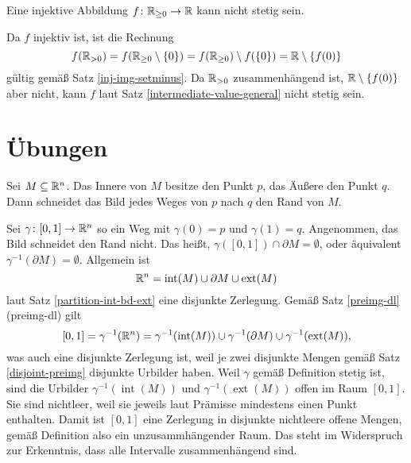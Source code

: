 \begin{Satz}
Eine injektive Abbildung $f\colon\mathbb R_{\ge 0}\to\mathbb R$ kann nicht stetig sein.
\end{Satz}
\begin{Beweis}
Da $f$ injektiv ist, ist die Rechnung
\[f(\mathbb R_{>0}) = f(\mathbb R_{\ge 0}\setminus\{0\})
= f(\mathbb R_{\ge 0})\setminus f(\{0\}) = \mathbb R\setminus\{f(0)\}\]
gültig gemäß Satz \ref{inj-img-setminus}. Da $\mathbb R_{>0}$ zusammenhängend
ist, $\mathbb R\setminus\{f(0)\}$ aber nicht, kann $f$ laut Satz
\ref{intermediate-value-general} nicht stetig sein.\,\qedsymbol
\end{Beweis}

\newpage
\section{Übungen}

\begin{Satz}
Sei $M\subseteq\mathbb R^n$. Das Innere von $M$ besitze den Punkt $p$,
das Äußere den Punkt $q$. Dann schneidet das Bild jedes Weges von $p$
nach $q$ den Rand von $M$.
\end{Satz}
\begin{Beweis}[Beweis 1]
Sei $\gamma\colon [0,1]\to\mathbb R^n$ so ein Weg mit
$\gamma(0)=p$ und $\gamma(1)=q$. Angenommen, das Bild schneidet
den Rand nicht. Das heißt, $\gamma([0,1])\cap\partial M = \emptyset$,
oder äquivalent $\gamma^{-1}(\partial M)=\emptyset$.
Allgemein ist
\[\mathbb R^n = \operatorname{int}(M) \cup \partial M \cup \operatorname{ext}(M)\]
laut Satz \ref{partition-int-bd-ext} eine disjunkte Zerlegung.
Gemäß Satz \ref{preimg-dl} (preimg-dl) gilt
\[[0,1] = \gamma^{-1}(\mathbb R^n) = \gamma^{-1}(\operatorname{int}(M))
\cup \gamma^{-1}(\partial M)\cup \gamma^{-1}(\operatorname{ext}(M)),\]
was auch eine disjunkte Zerlegung ist, weil je zwei disjunkte Mengen
gemäß Satz \ref{disjoint-preimg} disjunkte Urbilder haben.
Weil $\gamma$ gemäß Definition stetig ist,
sind die Urbilder $\gamma^{-1}(\operatorname{int}(M))$ und
$\gamma^{-1}(\operatorname{ext}(M))$ offen im Raum $[0,1]$. Sie sind
nichtleer, weil sie jeweils laut Prämisse mindestens einen Punkt
enthalten. Damit ist $[0,1]$ eine Zerlegung in disjunkte nichtleere
offene Mengen, gemäß Definition also ein unzusammhängender Raum. Das
steht im Widerspruch zur Erkenntnis, dass alle Intervalle
zusammenhängend sind.\,\qedsymbol
\end{Beweis}

